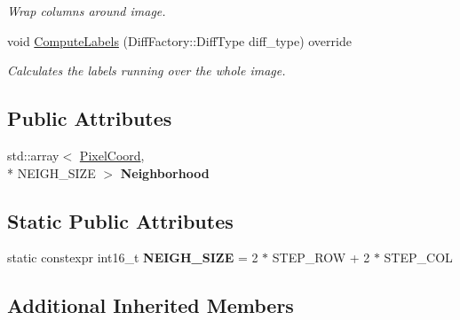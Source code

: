 \begin{DoxyCompactItemize}
\begin{DoxyCompactList}\small\item\em Wrap columns around image. \end{DoxyCompactList}\item 
\hypertarget{classdepth__clustering_1_1LinearImageLabeler_a987cca7d9daab304af4bcc448bf6de0f}{void \hyperlink{classdepth__clustering_1_1LinearImageLabeler_a987cca7d9daab304af4bcc448bf6de0f}{Compute\-Labels} (Diff\-Factory\-::\-Diff\-Type diff\-\_\-type) override}\label{classdepth__clustering_1_1LinearImageLabeler_a987cca7d9daab304af4bcc448bf6de0f}

\begin{DoxyCompactList}\small\item\em Calculates the labels running over the whole image. \end{DoxyCompactList}\end{DoxyCompactItemize}
\subsection*{Public Attributes}
\begin{DoxyCompactItemize}
\item 
\hypertarget{classdepth__clustering_1_1LinearImageLabeler_a7237797a8c13b16aa3cdefe913d8c938}{std\-::array$<$ \hyperlink{structdepth__clustering_1_1PixelCoord}{Pixel\-Coord}, \\*
N\-E\-I\-G\-H\-\_\-\-S\-I\-Z\-E $>$ {\bfseries Neighborhood}}\label{classdepth__clustering_1_1LinearImageLabeler_a7237797a8c13b16aa3cdefe913d8c938}

\end{DoxyCompactItemize}
\subsection*{Static Public Attributes}
\begin{DoxyCompactItemize}
\item 
\hypertarget{classdepth__clustering_1_1LinearImageLabeler_ad6a78dde18091847582a7cea428ed5fb}{static constexpr int16\-\_\-t {\bfseries N\-E\-I\-G\-H\-\_\-\-S\-I\-Z\-E} = 2 $\ast$ S\-T\-E\-P\-\_\-\-R\-O\-W + 2 $\ast$ S\-T\-E\-P\-\_\-\-C\-O\-L}\label{classdepth__clustering_1_1LinearImageLabeler_ad6a78dde18091847582a7cea428ed5fb}

\end{DoxyCompactItemize}
\subsection*{Additional Inherited Members}


